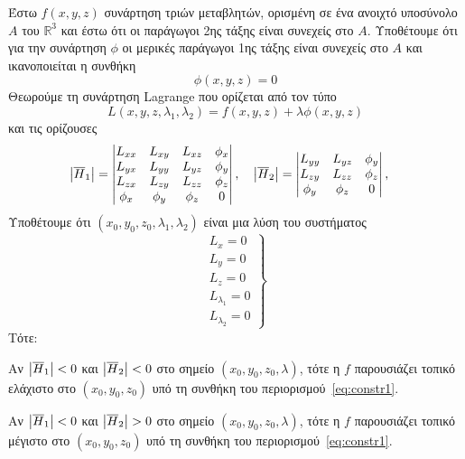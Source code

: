 \begin{thm}
    Έστω $ f(x,y,z) $ συνάρτηση τριών μεταβλητών, ορισμένη σε ένα ανοιχτό 
    υποσύνολο $A$ του $ \mathbb{R}^{3} $ και έστω ότι οι παράγωγοι 2ης τάξης είναι 
    συνεχείς στο $A$. Υποθέτουμε ότι για την συνάρτηση $ \phi $ οι μερικές παράγωγοι 
    1ης τάξης είναι συνεχείς στο $A$ και ικανοποιείται η συνθήκη 
    \begin{equation}
        \label{eq:constr1}
        \phi (x,y,z) = 0
    \end{equation}
    Θεωρούμε τη συνάρτηση Lagrange που ορίζεται από τον τύπο
    \[
        L(x,y,z, \lambda _{1}, \lambda _{2}) = f(x,y,z) + \lambda \phi (x,y,z) 
    \] 
    και τις ορίζουσες
    \[
        \abs{\overline{H}_{1}} = 
        \begin{vmatrix}
            L_{xx} & L_{xy} & L_{xz} & {\phi}_{x} \\
            L_{yx} & L_{yy} & L_{yz} & {\phi}_{y} \\
            L_{zx} & L_{zy} & L_{zz} & {\phi}_{z} \\
            {\phi}_{x} & {\phi}_{y} & {\phi}_{z} & 0
        \end{vmatrix}, \quad 
        \abs{\overline{H}_{2}} = 
        \begin{vmatrix}
            L_{yy} & L_{yz} & {\phi}_{y} \\
            L_{zy} & L_{zz} & {\phi}_{z} \\
            {\phi}_{y} & {\phi}_{z} & 0
        \end{vmatrix}, \quad 
    \] 
    Υποθέτουμε ότι $ (x_{0}, y_{0}, z_{0}, \lambda _{1}, \lambda _{2}) $ είναι μια 
    λύση του συστήματος 
    \[
        \left.
            \begin{matrix}
                L_{x} = 0 \\
                L_{y} = 0 \\
                L_{z} = 0 \\
                L_{\lambda _{1}} = 0 \\
                L_{\lambda _{2}} = 0 
            \end{matrix}
        \right\} 
    \]
    Τότε:
    \begin{myitemize}
        \item Αν $ \abs{\overline{H}_{1}} < 0 $ και $ \abs{\overline{H}_{2}} < 0 $ 
            στο σημείο $ (x_{0}, y_{0}, z_{0}, \lambda) $, τότε η $f$ 
            παρουσιάζει τοπικό ελάχιστο στο $ (x_{0}, y_{0}, z_{0}) $ υπό τη
            συνθήκη του περιορισμού~\eqref{eq:constr1}.
        \item Αν $ \abs{\overline{H}_{1}} < 0 $ και $ \abs{\overline{H}_{2}} > 0 $ 
            στο σημείο $ (x_{0}, y_{0}, z_{0}, \lambda) $, τότε η $f$ 
            παρουσιάζει τοπικό μέγιστο στο $ (x_{0}, y_{0}, z_{0}) $ υπό τη
            συνθήκη του περιορισμού~\eqref{eq:constr1}.
    \end{myitemize}
\end{thm}


